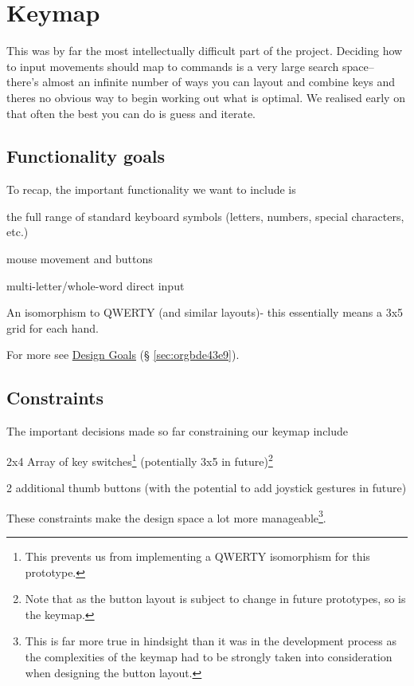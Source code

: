 \documentclass[logo,bsc,singlespacing,parskip]{infthesis}
\begin{document}
\section{Keymap}
\label{sec:org1779aaa}
This was by far the most intellectually difficult part of the project.
Deciding how to input movements should map to commands is a very large search space-- there's almost an infinite number of ways you can layout and combine keys and theres no obvious way to begin working out what is optimal.
We realised early on that often the best you can do is guess and iterate.

\subsection{Functionality goals}
\label{sec:org3790066}
To recap, the important functionality we want to include is
\begin{enumerate*}[label={\arabic*)}, itemjoin={, \,}, itemjoin*={, and \,}]
\item the full range of standard keyboard symbols (letters, numbers, special characters, etc.)
\item mouse movement and buttons
\item multi-letter/whole-word direct input
\item An isomorphism to QWERTY (and similar layouts)- this essentially means a 3x5 grid for each hand.
\end{enumerate*}
For more see \hyperref[sec:orgbde43e9]{Design Goals} (§ \ref{sec:orgbde43e9}).

\subsection{Constraints}
\label{sec:org8571176}
The important decisions made so far constraining our keymap include
\begin{enumerate*}[label={\arabic*)}, itemjoin={, \,}, itemjoin*={, and \,}]
\item 2x4 Array of key switches\footnote{This prevents us from implementing a QWERTY isomorphism for this prototype.} (potentially 3x5 in future)\footnote{Note that as the button layout is subject to change in future prototypes, so is the keymap.}
\item 2 additional thumb buttons (with the potential to add joystick gestures in future)
\end{enumerate*}
These constraints make the design space a lot more manageable\footnote{This is far more true in hindsight than it was in the development process as the complexities of the keymap had to be strongly taken into consideration when designing the button layout.}.
\end{document}
